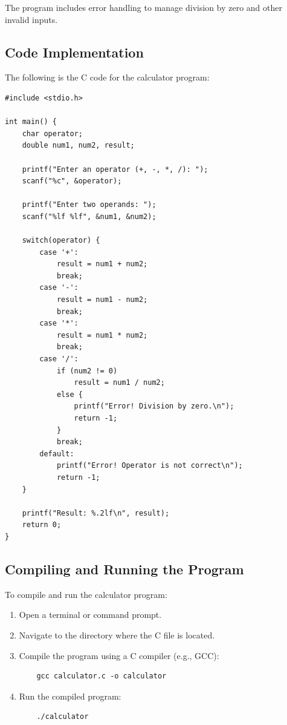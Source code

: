 \documentclass{article}
\begin{document}
The program includes error handling to manage division by zero and other invalid inputs.

\subsection{Code Implementation}
The following is the C code for the calculator program:

\begin{verbatim}
#include <stdio.h>

int main() {
    char operator;
    double num1, num2, result;

    printf("Enter an operator (+, -, *, /): ");
    scanf("%c", &operator);

    printf("Enter two operands: ");
    scanf("%lf %lf", &num1, &num2);

    switch(operator) {
        case '+':
            result = num1 + num2;
            break;
        case '-':
            result = num1 - num2;
            break;
        case '*':
            result = num1 * num2;
            break;
        case '/':
            if (num2 != 0)
                result = num1 / num2;
            else {
                printf("Error! Division by zero.\n");
                return -1;
            }
            break;
        default:
            printf("Error! Operator is not correct\n");
            return -1;
    }

    printf("Result: %.2lf\n", result);
    return 0;
}
\end{verbatim}

\subsection{Compiling and Running the Program}
To compile and run the calculator program:
\begin{enumerate}
    \item Open a terminal or command prompt.
    \item Navigate to the directory where the C file is located.
    \item Compile the program using a C compiler (e.g., GCC):
    \begin{verbatim}
    gcc calculator.c -o calculator
    \end{verbatim}
    \item Run the compiled program:
    \begin{verbatim}
    ./calculator
    \end{verbatim}
\end{enumerate}
\end{document}
